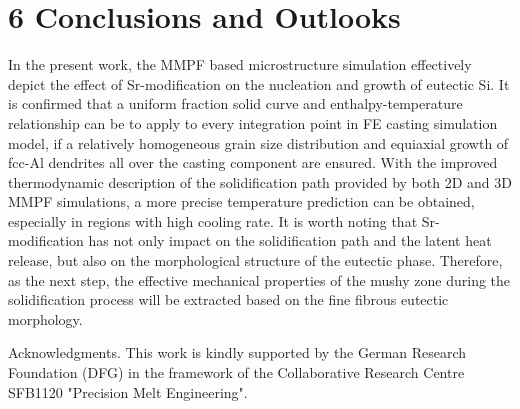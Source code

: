 \documentclass[10pt]{article}
\begin{document}
\section*{6 Conclusions and Outlooks}
In the present work, the MMPF based microstructure simulation effectively depict the effect of Sr-modification on the nucleation and growth of eutectic Si. It is confirmed that a uniform fraction solid curve and enthalpy-temperature relationship can be to apply to every integration point in FE casting simulation model, if a relatively homogeneous grain size distribution and equiaxial growth of fcc-Al dendrites all over the casting component are ensured. With the improved thermodynamic description of the solidification path provided by both 2D and 3D MMPF simulations, a more precise temperature prediction can be obtained, especially in regions with high cooling rate. It is worth noting that Sr-modification has not only impact on the solidification path and the latent heat release, but also on the morphological structure of the eutectic phase. Therefore, as the next step, the effective mechanical properties of the mushy zone during the solidification process will be extracted based on the fine fibrous eutectic morphology.

Acknowledgments. This work is kindly supported by the German Research Foundation (DFG) in the framework of the Collaborative Research Centre SFB1120 "Precision Melt Engineering".
\end{document}
